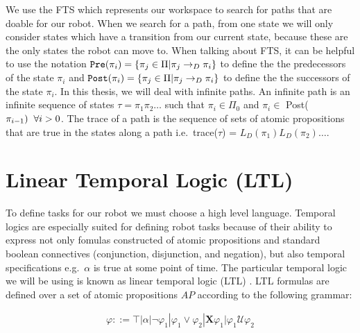 We use the FTS which represents our workspace to search for paths that are doable for our robot. When we search for a path, from one state we will only consider states which have a transition from our current state, because these are the only states the robot can move to. When talking about FTS, it can be helpful to use the notation $\texttt{Pre}(\pi_i) = \{\pi_j \in \Pi | \pi_j \rightarrow_D \pi_i\}$ to define the the predecessors of the state $\pi_i$ and $\texttt{Post}(\pi_i) = \{\pi_j \in \Pi | \pi_j \rightarrow_D \pi_i\}$ to define the the successors of the state $\pi_i$. In this thesis, we will deal with infinite paths. An infinite path is an infinite sequence of states $\tau = \pi_1 \pi_2 \dots$ such that $\pi_i \in \Pi_0$ and $\pi_i \in $ Post($\pi_{i-1}) \hspace{0.2cm} \forall i > 0$. The trace of a path is the sequence of sets of atomic propositions that are true in the states along a path i.e.\ trace($\tau$) = $L_D(\pi_1)L_D(\pi_2) \dots$.  


\section{Linear Temporal Logic (LTL)}
To define tasks for our robot we must choose a high level language. Temporal logics are especially suited for defining robot tasks because of their ability to express not only fomulas constructed of atomic propositions and standard boolean connectives (conjunction, disjunction, and negation), but also temporal specifications e.g.\ $\alpha$ is true at some point of time. The particular temporal logic we will be using is known as linear temporal logic (LTL) \cite{clarke99}. LTL formulas are defined over a set of atomic propositions $AP$ according to the following grammar:

\begin{align*}
    \varphi ::= \top | \alpha | \neg \varphi_1 | \varphi_1  \lor \varphi_2 | \textbf{X} \varphi_1 | \varphi_1 \bm{\mathcal{U}} \varphi_2
\end{align*}

